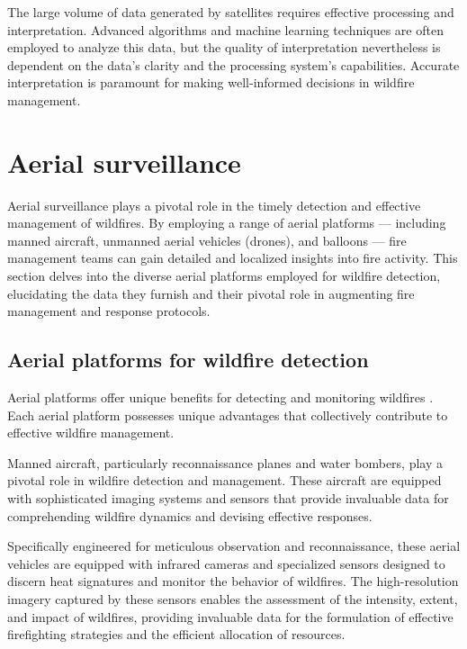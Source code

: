 \documentclass[
  12 pt,
]{Nemilov}
\begin{document}
The large volume of data generated by satellites requires effective processing and interpretation. Advanced algorithms and machine learning techniques are often employed to analyze this data, but the quality of interpretation nevertheless is dependent on the data's clarity and the processing system's capabilities. Accurate interpretation is paramount for making well-informed decisions in wildfire management.

\section{Aerial surveillance}\label{aerial-surveillance}

Aerial surveillance plays a pivotal role in the timely detection and effective management of wildfires. By employing a range of aerial platforms --- including manned aircraft, unmanned aerial vehicles (drones), and balloons --- fire management teams can gain detailed and localized insights into fire activity. This section delves into the diverse aerial platforms employed for wildfire detection, elucidating the data they furnish and their pivotal role in augmenting fire management and response protocols.

\subsection{Aerial platforms for wildfire detection}\label{aerial-platforms-for-wildfire-detection}

Aerial platforms offer unique benefits for detecting and monitoring wildfires \citep{allison2016airborne}. Each aerial platform possesses unique advantages that collectively contribute to effective wildfire management.

Manned aircraft, particularly reconnaissance planes and water bombers, play a pivotal role in wildfire detection and management. These aircraft are equipped with sophisticated imaging systems and sensors that provide invaluable data for comprehending wildfire dynamics and devising effective responses.

Specifically engineered for meticulous observation and reconnaissance, these aerial vehicles are equipped with infrared cameras and specialized sensors designed to discern heat signatures and monitor the behavior of wildfires. The high-resolution imagery captured by these sensors enables the assessment of the intensity, extent, and impact of wildfires, providing invaluable data for the formulation of effective firefighting strategies and the efficient allocation of resources.
\end{document}
